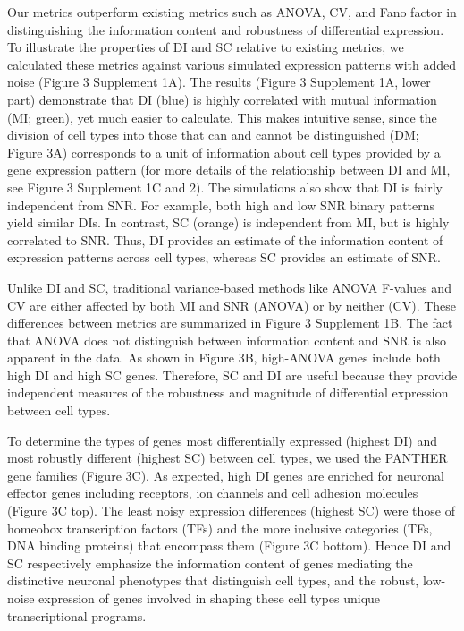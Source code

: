 Our metrics outperform existing metrics such as ANOVA, CV, and Fano factor in distinguishing the information content and robustness of differential expression. To illustrate the properties of DI and SC relative to existing metrics, we calculated these metrics against various simulated expression patterns with added noise (Figure 3 Supplement 1A). The results (Figure 3 Supplement 1A, lower part) demonstrate that DI (blue) is highly correlated with mutual information (MI; green), yet much easier to calculate. This makes intuitive sense, since the division of cell types into those that can and cannot be distinguished (DM; Figure 3A) corresponds to a unit of information about cell types provided by a gene expression pattern (for more details of the relationship between DI and MI, see Figure 3 Supplement 1C and 2). 
The simulations also show that DI is fairly independent from SNR. For example, both high and low SNR binary patterns yield similar DIs. In contrast, SC (orange) is independent from MI, but is highly correlated to SNR. Thus, DI provides an estimate of the information content of expression patterns across cell types, whereas SC provides an estimate of SNR.

Unlike DI and SC, traditional variance-based methods like ANOVA F-values and CV are either affected by both MI and SNR (ANOVA) or by neither (CV). These differences between metrics are summarized in Figure 3 Supplement 1B. The fact that ANOVA does not distinguish between information content and SNR is also apparent in the data. As shown in Figure 3B, high-ANOVA genes include both high DI and high SC genes. Therefore, SC and DI are useful because they provide independent measures of the robustness and magnitude of differential expression between cell types.

To determine the types of genes most differentially expressed (highest DI) and most robustly different (highest SC) between cell types, we used the PANTHER \citep{Thomas_2003} gene families (Figure 3C). As expected, high DI genes are enriched for neuronal effector genes including receptors, ion channels and cell adhesion molecules (Figure 3C top). The least noisy expression differences (highest SC) were those of homeobox transcription factors (TFs) and the more inclusive categories (TFs, DNA binding proteins) that encompass them (Figure 3C bottom). Hence DI and SC respectively emphasize the information content of genes  mediating the distinctive neuronal phenotypes that distinguish cell types, and the robust, low-noise expression of genes involved in shaping these cell types unique transcriptional programs.

